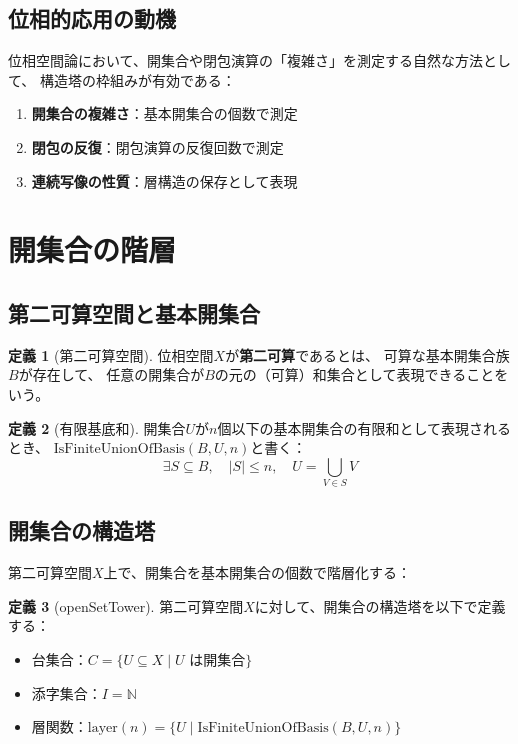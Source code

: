 \documentclass[a4paper,12pt]{ltjsarticle}
\theoremstyle{definition}
\newtheorem{definition}{定義}[section]
\newcommand{\N}{\mathbb{N}}
\begin{document}
\subsection{位相的応用の動機}

位相空間論において、開集合や閉包演算の「複雑さ」を測定する自然な方法として、
構造塔の枠組みが有効である：

\begin{enumerate}
  \item \textbf{開集合の複雑さ}：基本開集合の個数で測定
  \item \textbf{閉包の反復}：閉包演算の反復回数で測定
  \item \textbf{連続写像の性質}：層構造の保存として表現
\end{enumerate}

\section{開集合の階層}

\subsection{第二可算空間と基本開集合}

\begin{definition}[第二可算空間]
位相空間$X$が\textbf{第二可算}であるとは、
可算な基本開集合族$B$が存在して、
任意の開集合が$B$の元の（可算）和集合として表現できることをいう。
\end{definition}

\begin{definition}[有限基底和]
開集合$U$が$n$個以下の基本開集合の有限和として表現されるとき、
$\mathrm{IsFiniteUnionOfBasis}(B, U, n)$と書く：
\[
\exists S \subseteq B, \quad |S| \leq n, \quad U = \bigcup_{V \in S} V
\]
\end{definition}

\subsection{開集合の構造塔}

第二可算空間$X$上で、開集合を基本開集合の個数で階層化する：

\begin{definition}[openSetTower]
第二可算空間$X$に対して、開集合の構造塔を以下で定義する：
\begin{itemize}
  \item 台集合：$C = \{U \subseteq X \mid U \text{ は開集合}\}$
  \item 添字集合：$I = \N$
  \item 層関数：$\mathrm{layer}(n) = \{U \mid \mathrm{IsFiniteUnionOfBasis}(B, U, n)\}$
\end{itemize}
\end{definition}
\end{document}
